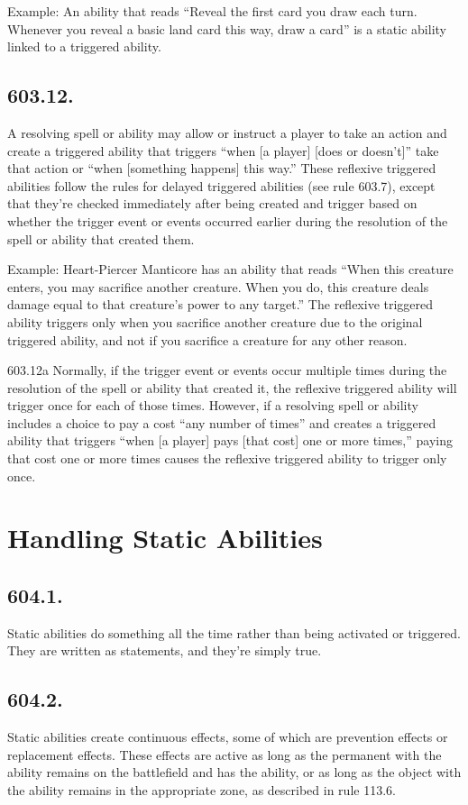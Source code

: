 Example: An ability that reads “Reveal the first card you draw each turn. Whenever you reveal a basic land card this way, draw a card” is a static ability linked to a triggered ability.

\subsection*{603.12.}
A resolving spell or ability may allow or instruct a player to take an action and create a triggered ability that triggers “when [a player] [does or doesn’t]” take that action or “when [something happens] this way.” These reflexive triggered abilities follow the rules for delayed triggered abilities (see rule 603.7), except that they’re checked immediately after being created and trigger based on whether the trigger event or events occurred earlier during the resolution of the spell or ability that created them.

Example: Heart-Piercer Manticore has an ability that reads “When this creature enters, you may sacrifice another creature. When you do, this creature deals damage equal to that creature’s power to any target.” The reflexive triggered ability triggers only when you sacrifice another creature due to the original triggered ability, and not if you sacrifice a creature for any other reason.

603.12a Normally, if the trigger event or events occur multiple times during the resolution of the spell or ability that created it, the reflexive triggered ability will trigger once for each of those times. However, if a resolving spell or ability includes a choice to pay a cost “any number of times” and creates a triggered ability that triggers “when [a player] pays [that cost] one or more times,” paying that cost one or more times causes the reflexive triggered ability to trigger only once.

\section{Handling Static Abilities}
\subsection*{604.1.}
Static abilities do something all the time rather than being activated or triggered. They are written as statements, and they’re simply true.

\subsection*{604.2.}
Static abilities create continuous effects, some of which are prevention effects or replacement effects. These effects are active as long as the permanent with the ability remains on the battlefield and has the ability, or as long as the object with the ability remains in the appropriate zone, as described in rule 113.6.


